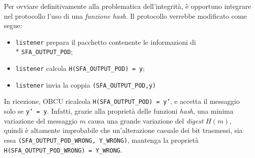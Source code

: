 Per ovviare definitivamente alla problematica dell'integrit\`a, \`e opportuno integrare nel protocollo l'uso di una \emph{funzione hash}. Il protocollo verrebbe modificato come segue:
\begin{itemize}
	\item \texttt{listener} prepara il pacchetto contenente le informazioni di\\* \texttt{SFA\_OUTPUT\_POD};
	\item \texttt{listener} calcola \texttt{H(SFA\_OUTPUT\_POD) = y};
	\item \texttt{listener} invia la coppia \texttt{(SFA\_OUTPUT\_POD,y)}
\end{itemize}
In ricezione, OBCU ricalcola \texttt{H(SFA\_OUTPUT\_POD) = y'}, e accetta il messaggio solo se \texttt{y' = y}. Infatti, grazie alla propriet\`a delle funzioni \emph{hash}, una minima variazione del messaggio $m$ causa una grande variazione del \emph{digest} $H(m)$, quindi \`e altamente improbabile che un'alterazione casuale dei bit trasmessi, sia essa \texttt{(SFA\_OUTPUT\_POD\_WRONG, Y\_WRONG)}, mantenga la propriet\`a \texttt{H(SFA\_OUTPUT\_POD\_WRONG) = Y\_WRONG}.
